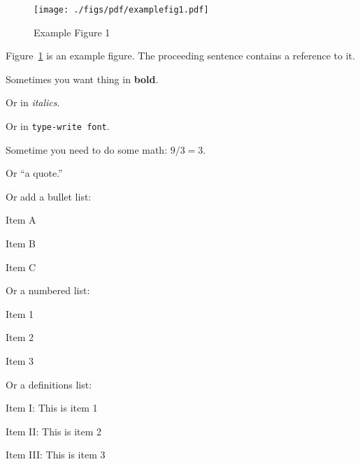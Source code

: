 \documentclass[11pt,twocolumn,letterpaper]{article}
\begin{document}

\begin{figure}[htb]
  \centering
  \texttt{[image: ./figs/pdf/examplefig1.pdf]}
  \caption{Example Figure 1}
  \label{fig:example1}
\end{figure}

\noindent
Figure~\ref{fig:example1} is an example figure. The proceeding
sentence contains a reference to it.

\noindent
Sometimes you want thing in {\bf bold}.

\noindent
Or in {\em italics}.

\noindent
Or in \texttt{type-write font}.

\noindent
Sometime you need to do some math: $9/3=3$.

\noindent
Or ``a quote.''

\noindent
Or add a bullet list:

\begin{packed_item}
\item Item A
\item Item B
\item Item C
\end{packed_item}

\noindent
Or a numbered list:

\begin{packed_enum}
\item Item 1
\item Item 2
\item Item 3
\end{packed_enum}

\noindent
Or a definitions list:

\begin{packed_desc}
\item[Item I:] This is item 1 
\item[Item II:] This is item 2
\item[Item III:] This is item 3
\end{packed_desc}




\end{document}
